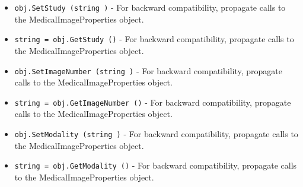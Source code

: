 \begin{itemize}
\item  \verb|obj.SetStudy (string )| -  For backward compatibility, propagate calls to the MedicalImageProperties
 object.

\item  \verb|string = obj.GetStudy ()| -  For backward compatibility, propagate calls to the MedicalImageProperties
 object.

\item  \verb|obj.SetImageNumber (string )| -  For backward compatibility, propagate calls to the MedicalImageProperties
 object.

\item  \verb|string = obj.GetImageNumber ()| -  For backward compatibility, propagate calls to the MedicalImageProperties
 object.

\item  \verb|obj.SetModality (string )| -  For backward compatibility, propagate calls to the MedicalImageProperties
 object.

\item  \verb|string = obj.GetModality ()| -  For backward compatibility, propagate calls to the MedicalImageProperties
 object.

\end{itemize}
